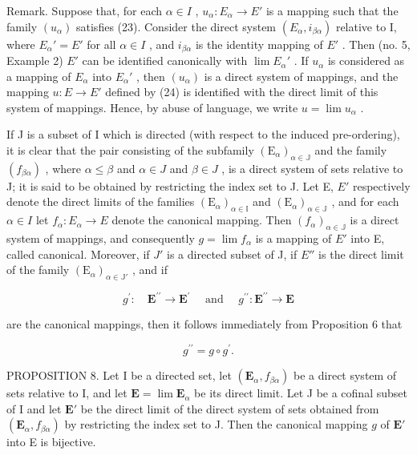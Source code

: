 Remark. Suppose that, for each \(\alpha \in I\) , \(u_{\alpha}: E_{\alpha} \to E'\) is a mapping such that the family \((u_{\alpha})\) satisfies (23). Consider the direct system \((E_{\alpha}, i_{\beta \alpha})\) relative to I, where \(E_{\alpha}' = E'\) for all \(\alpha \in I\) , and \(i_{\beta \alpha}\) is the identity mapping of \(E'\) . Then (no. 5, Example 2) \(E'\) can be identified canonically with \(\lim E_{\alpha}'\) . If \(u_{\alpha}\) is considered as a mapping of \(E_{\alpha}\) into \(E_{\alpha}'\) , then \((u_{\alpha})\) is a direct system of mappings, and the mapping \(u: E \to E'\) defined by (24) is identified with the direct limit of this system of mappings. Hence, by abuse of language, we write \(u = \lim u_{\alpha}\) .

If J is a subset of I which is directed (with respect to the induced pre-ordering), it is clear that the pair consisting of the subfamily \((\mathrm{E}_{\alpha})_{\alpha\in\mathbb{J}}\) and the family \((f_{\beta\alpha})\) , where \(\alpha\leqslant\beta\) and \(\alpha\in J\) and \(\beta\in J\) , is a direct system of sets relative to J; it is said to be obtained by restricting the index set to J. Let E, \(E'\) respectively denote the direct limits of the families \((\mathrm{E}_{\alpha})_{\alpha\in\mathbb{I}}\) and \((\mathrm{E}_{\alpha})_{\alpha\in\mathbb{J}}\) , and for each \(\alpha\in I\) let \(f_{\alpha}:E_{\alpha}\to E\) denote the canonical mapping. Then \((f_{\alpha})_{\alpha\in\mathbb{J}}\) is a direct system of mappings, and consequently \(g=\lim f_{\alpha}\) is a mapping of \(E'\) into E, called canonical. Moreover, if \(J'\) is a directed subset of J, if \(E''\) is the direct limit of the family \((\mathrm{E}_{\alpha})_{\alpha\in\mathbb{J}'}\) , and if

\[
g ^ {\prime}: \quad \mathbf {E} ^ {\prime \prime} \rightarrow \mathbf {E} ^ {\prime} \quad \text { and } \quad g ^ {\prime \prime}: \mathbf {E} ^ {\prime \prime} \rightarrow \mathbf {E}
\]

are the canonical mappings, then it follows immediately from Proposition 6 that

\[
g ^ {\prime \prime} = g \circ g ^ {\prime}.\tag{28}
\]

PROPOSITION 8. Let I be a directed set, let \((\mathbf{E}_{\alpha}, f_{\beta \alpha})\) be a direct system of sets relative to I, and let \(\mathbf{E} = \lim \mathbf{E}_{\alpha}\) be its direct limit. Let J be a cofinal subset of I and let \(\mathbf{E}'\) be the direct limit of the direct system of sets obtained from \((\mathbf{E}_{\alpha}, f_{\beta \alpha})\) by restricting the index set to J. Then the canonical mapping \(g\) of \(\mathbf{E}'\) into E is bijective.

